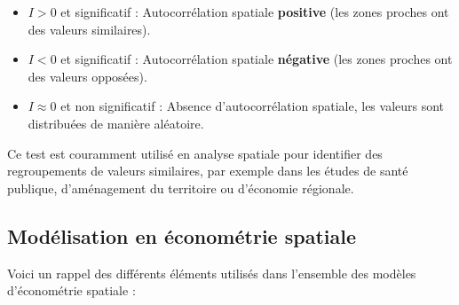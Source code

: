 \documentclass[
]{article}
\begin{document}
\begin{itemize}
    \item \( I > 0 \) et significatif : Autocorrélation spatiale \textbf{positive} (les zones proches ont des valeurs similaires).
    \item \( I < 0 \) et significatif : Autocorrélation spatiale \textbf{négative} (les zones proches ont des valeurs opposées).
    \item \( I \approx 0 \) et non significatif : Absence d’autocorrélation spatiale, les valeurs sont distribuées de manière aléatoire.
\end{itemize}

Ce test est couramment utilisé en analyse spatiale pour identifier des
regroupements de valeurs similaires, par exemple dans les études de
santé publique, d'aménagement du territoire ou d'économie régionale.

\subsection{Modélisation en économétrie
spatiale}\label{moduxe9lisation-en-uxe9conomuxe9trie-spatiale}

Voici un rappel des différents éléments utilisés dans l'ensemble des
modèles d'économétrie spatiale :
\end{document}
